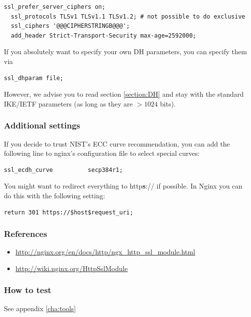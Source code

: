\begin{lstlisting}[breaklines]
  ssl_prefer_server_ciphers on;
  ssl_protocols TLSv1 TLSv1.1 TLSv1.2; # not possible to do exclusive
  ssl_ciphers '@@@CIPHERSTRINGB@@@';
  add_header Strict-Transport-Security max-age=2592000;
\end{lstlisting}

If you absolutely want to specify your own DH parameters, you can specify them via

\begin{lstlisting}[breaklines]
  ssl_dhparam file;
\end{lstlisting}

However, we advise you to read section \ref{section:DH} and stay with the standard IKE/IETF parameters (as long as they are $ > 1024 $ bits).

\subsubsection{Additional settings}

If you decide to trust NIST's ECC curve recommendation, you can add the following line to nginx's configuration file to select special curves:

\begin{lstlisting}[breaklines]
  ssl_ecdh_curve          secp384r1;
\end{lstlisting}

You might want to redirect everything to http\textbf{s}:// if possible. In Nginx you can do this with the following setting:

\begin{lstlisting}[breaklines]
  return 301 https://$host$request_uri;
\end{lstlisting}


\subsubsection{References} 
\begin{itemize}
\item \url{http://nginx.org/en/docs/http/ngx_http_ssl_module.html}
\item \url{http://wiki.nginx.org/HttpSslModule}
\end{itemize}

\subsubsection{How to test}
See appendix \ref{cha:tools}





